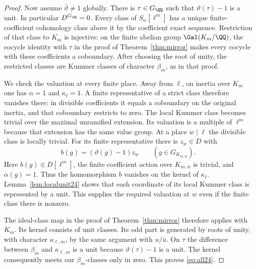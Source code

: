 \documentclass[a4paper,11pt]{article}
\theoremstyle{definition}
\theoremstyle{remark}
\numberwithin{equation}{section}
\begin{document}
\begin{proof}
Now assume \(\bar\vartheta\ne1\) globally. There is \(\tau\in G_\QQ\) such that \(\vartheta(\tau)-1\) is a unit. In particular \(D^{G_\QQ}=0\). Every class of \(S_\alpha[\ell^m]\) has a unique finite-coefficient cohomology class above it by the coefficient exact sequence. Restriction of that class to \(K_m\) is injective: on the finite abelian group \(\Gal(K_m/\QQ)\), the cocycle identity with \(\tau\) in the proof of Theorem~\ref{thm:mirror} makes every cocycle with these coefficients a coboundary. After choosing the root of unity, the restricted classes are Kummer classes of character \(\beta_m\), as in that proof.

We check the valuation at every finite place. Away from \(\ell\), on inertia over \(K_m\) one has \(\alpha=1\) and \(\kappa_\ell=1\). A finite representative of a strict class therefore vanishes there: in divisible coefficients it equals a coboundary on the original inertia, and that coboundary restricts to zero. The local Kummer class becomes trivial over the maximal unramified extension. Its valuation is a multiple of \(\ell^m\) because that extension has the same value group. At a place \(w\mid\ell\) the divisible class is locally trivial. For its finite representative there is \(z_w\in D\) with
\[
        b(g)=(\vartheta(g)-1)z_w\qquad(g\in G_{K_{m,w}}).
\]
Here \(b(g)\in D[\ell^m]\), the finite coefficient action over \(K_{m,w}\) is trivial, and \(\alpha(g)=1\). Thus the homomorphism \(b\) vanishes on the kernel of \(\kappa_\ell\). Lemma~\ref{lem:localunit24} shows that each coordinate of its local Kummer class is represented by a unit. This supplies the required valuation at \(w\) even if the finite class there is nonzero.

The ideal-class map in the proof of Theorem~\ref{thm:mirror} therefore applies with \(K_m\). Its kernel consists of unit classes. Its odd part is generated by roots of unity, with character \(\kappa_{\ell,m}\), by the same argument with \(u/\bar u\). On \(\tau\) the difference between \(\beta_m\) and \(\kappa_{\ell,m}\) is a unit because \(\vartheta(\tau)-1\) is a unit. The kernel consequently meets our \(\beta_m\)-classes only in zero. This proves \eqref{eq:all24}.
\end{proof}
\end{document}
